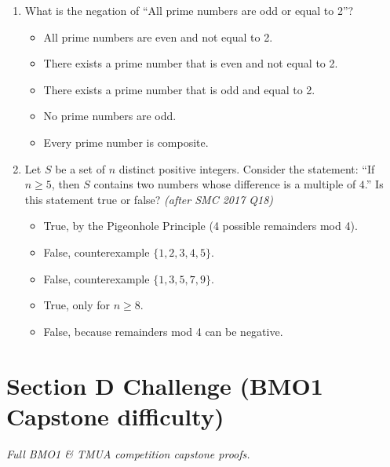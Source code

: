 \documentclass[11pt,a4paper]{article}
\begin{document}
\begin{enumerate}
\item What is the negation of ``All prime numbers are odd or equal to 2''?
\begin{itemize}
\item[A)] All prime numbers are even and not equal to 2.
\item[B)] There exists a prime number that is even and not equal to 2.
\item[C)] There exists a prime number that is odd and equal to 2.
\item[D)] No prime numbers are odd.
\item[E)] Every prime number is composite.
\end{itemize}

\item Let $S$ be a set of $n$ distinct positive integers. Consider the statement: ``If $n \ge 5$, then $S$ contains two numbers whose difference is a multiple of $4$.'' Is this statement true or false? \textit{\small(after SMC 2017 Q18)}
\begin{itemize}
\item[A)] True, by the Pigeonhole Principle (4 possible remainders mod 4).
\item[B)] False, counterexample $\{1, 2, 3, 4, 5\}$.
\item[C)] False, counterexample $\{1, 3, 5, 7, 9\}$.
\item[D)] True, only for $n \ge 8$.
\item[E)] False, because remainders mod 4 can be negative.
\end{itemize}

\end{enumerate}

\section*{Section D \quad Challenge \hfill{\normalfont\small(BMO1 Capstone difficulty)}}

\noindent\textit{Full BMO1 \& TMUA competition capstone proofs.}
\end{document}
